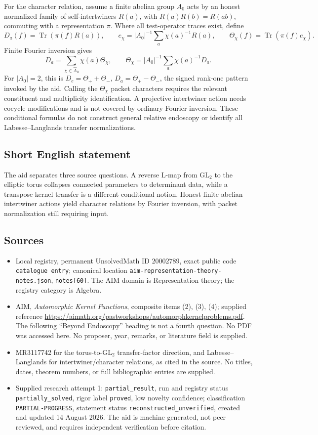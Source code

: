 \documentclass[11pt]{article}
\begin{document}
For the character relation, assume a finite abelian group \(A_0\) acts by an honest normalized family of self-intertwiners \(R(a)\), with \(R(a)R(b)=R(ab)\), commuting with a representation \(\pi\). Where all test-operator traces exist, define
\[
 D_a(f)=\operatorname{Tr}(\pi(f)R(a)),\qquad
 e_\chi=|A_0|^{-1}\sum_a\chi(a)^{-1}R(a),\qquad
 \Theta_\chi(f)=\operatorname{Tr}(\pi(f)e_\chi).
\]
Finite Fourier inversion gives
\[
 D_a=\sum_{\chi\in\widehat A_0}\chi(a)\Theta_\chi,\qquad
 \Theta_\chi=|A_0|^{-1}\sum_a\chi(a)^{-1}D_a.
\]
For \(|A_0|=2\), this is \(D_e=\Theta_++\Theta_-\), \(D_a=\Theta_+-\Theta_-\), the signed rank-one pattern invoked by the aid. Calling the \(\Theta_\chi\) packet characters requires the relevant constituent and multiplicity identification. A projective intertwiner action needs cocycle modifications and is not covered by ordinary Fourier inversion. These conditional formulas do not construct general relative endoscopy or identify all Labesse--Langlands transfer normalizations.
\subsection{Short English statement}
The aid separates three source questions. A reverse L-map from \(\mathrm{GL}_2\) to the elliptic torus collapses connected parameters to determinant data, while a transpose kernel transfer is a different conditional notion. Honest finite abelian intertwiner actions yield character relations by Fourier inversion, with packet normalization still requiring input.
\subsection{Sources}
\begin{itemize}
\item Local registry, permanent UnsolvedMath ID \(20002789\), exact public code \texttt{catalogue entry}; canonical location \texttt{aim-representation-theory-notes.json}, \texttt{notes[60]}. The AIM domain is Representation theory; the registry category is Algebra.
\item AIM, \emph{Automorphic Kernel Functions}, composite items (2), (3), (4); supplied reference \url{https://aimath.org/pastworkshops/automorphkernelproblems.pdf}. The following ``Beyond Endoscopy'' heading is not a fourth question. No PDF was accessed here. No proposer, year, remarks, or literature field is supplied.
\item MR3117742 for the torus-to-\(\mathrm{GL}_2\) transfer-factor direction, and Labesse--Langlands for intertwiner/character relations, as cited in the source. No titles, dates, theorem numbers, or full bibliographic entries are supplied.
\item Supplied research attempt 1: \texttt{partial\_result}, run and registry status \texttt{partially\_solved}, rigor label \texttt{proved}, low novelty confidence; classification \texttt{PARTIAL-PROGRESS}, statement status \texttt{reconstructed\_unverified}, created and updated 14 August 2026. The aid is machine generated, not peer reviewed, and requires independent verification before citation.
\end{itemize}
\end{document}
